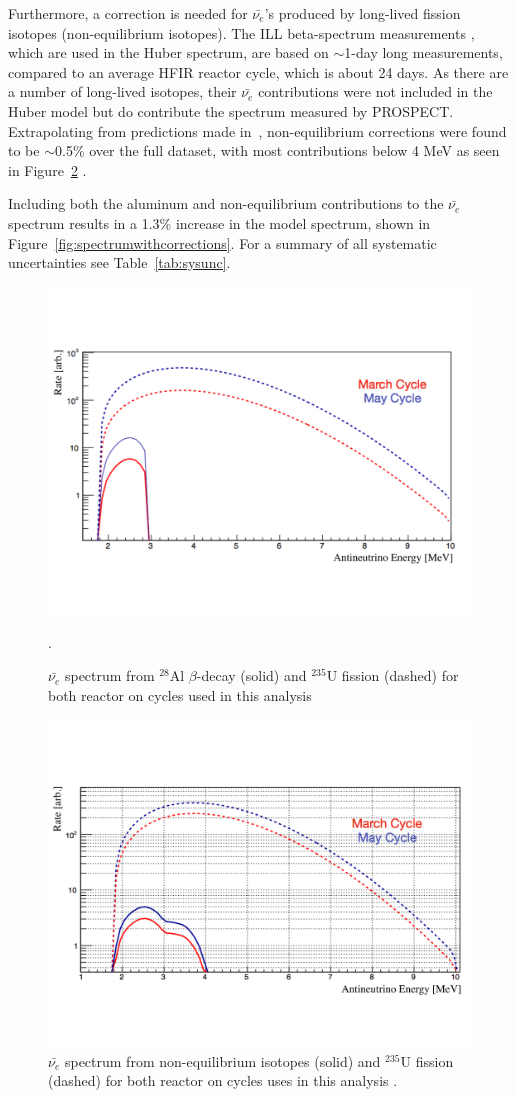 Furthermore, a correction is needed for $\bar{\nu_{e}}$'s produced by long-lived fission isotopes (non-equilibrium isotopes).
The ILL beta-spectrum measurements \cite{VonFeilitzsch:1982jw, Schreckenbach:1985ep, Hahn:1989zr}, which are used in the Huber spectrum, are based on $\sim$1-day long measurements, compared to an average HFIR reactor cycle, which is about 24 days.
As there are a number of long-lived isotopes, their $\bar{\nu_{e}}$ contributions were not included in the Huber model but do contribute the spectrum measured by PROSPECT.
Extrapolating from predictions made in~\cite{Mueller}, non-equilibrium corrections were found to be $\sim$0.5\% over the full dataset, with most contributions below 4 MeV as seen in Figure~\ref{fig:noneqcontrib} \cite{PSurukuchi:2346}.

Including both the aluminum and non-equilibrium contributions to the $\bar{\nu_{e}}$ spectrum results in a 1.3\% increase in the model spectrum, shown in Figure~\ref{fig:spectrumwithcorrections}.
For a summary of all systematic uncertainties see Table~\ref{tab:sysunc}.

\begin{figure}[H]
	\centering
	\includegraphics[width=0.6\linewidth]{tex/7-oscillation-images/AlContrib}
	\caption[]{$\bar{\nu_{e}}$ spectrum from $^{28}$Al $\beta$-decay (solid) and $^{235}$U fission (dashed) for both reactor on cycles used in this analysis \cite{PSurukuchi:2338}}.
	\label{fig:alcontrib}
\end{figure}

\begin{figure}[H]
	\centering
	\includegraphics[width=0.6\linewidth]{tex/7-oscillation-images/NonEqContrib}
	\caption[]{$\bar{\nu_{e}}$ spectrum from non-equilibrium isotopes (solid) and $^{235}$U fission (dashed) for both reactor on cycles uses in this analysis \cite{PSurukuchi:2346}.}
	\label{fig:noneqcontrib}
\end{figure}

